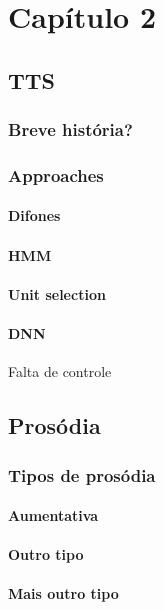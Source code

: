 \chapter{Capítulo 2}

\section{TTS}
\subsection{Breve história?}
\subsection{Approaches}
\subsubsection{Difones}
\subsubsection{HMM}
\subsubsection{Unit selection}
\subsubsection{DNN}
Falta de controle
\subsubsection{}
\section{Prosódia}
\subsection{Tipos de prosódia}
\subsubsection{Aumentativa}
\subsubsection{Outro tipo}
\subsubsection{Mais outro tipo}
